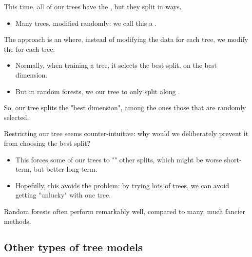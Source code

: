         This time, all of our trees have the , but they split in  ways.

        \begin{itemize}
            \item Many trees, modified randomly: we call this a .\\
        \end{itemize}

        \begin{definition}
            The  approach is an  where, instead of modifying the data for each tree, we modify the  for each tree.

            \begin{itemize}
                \item Normally, when training a tree, it selects the best split, on the best dimension.

                \item But in random forests, we  our tree to only split along .
            \end{itemize}

            So, our tree splits the "best dimension", among the ones those that are randomly selected.
        \end{definition}

        Restricting our tree seems counter-intuitive: why would we deliberately prevent it from choosing the best split?

        \begin{itemize}
            \item This forces some of our trees to "" other splits, which might be worse short-term, but better long-term.

            \item Hopefully, this avoids the  problem: by trying lots of trees, we can avoid getting "unlucky" with one tree.
        \end{itemize}

        Random forests often perform remarkably well, compared to many, much fancier methods. 




    \pagebreak

    \subsection{Other types of tree models}

